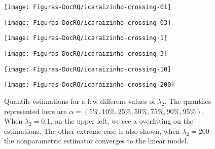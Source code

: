 	
\begin{figure*}[htp]
  \centering
  \begin{minipage}[t]{0.4\linewidth}
    \centering
    \begin{minipage}[t]{\linewidth}
      \centering     \texttt{[image: Figuras-DocRQ/icaraizinho-crossing-01]}
    \end{minipage}
    \begin{minipage}[b]{\linewidth}
      \centering     \texttt{[image: Figuras-DocRQ/icaraizinho-crossing-03]}
    \end{minipage}
     \begin{minipage}[b]{\linewidth}
      \centering     \texttt{[image: Figuras-DocRQ/icaraizinho-crossing-1]}
     \end{minipage}
  \end{minipage}
  \begin{minipage}[t]{0.4\linewidth}
    \centering
    \begin{minipage}[t]{\linewidth}
      \centering     \texttt{[image: Figuras-DocRQ/icaraizinho-crossing-3]}
    \end{minipage}
    \begin{minipage}[b]{\linewidth}
      \centering     \texttt{[image: Figuras-DocRQ/icaraizinho-crossing-10]}
    \end{minipage}
     \begin{minipage}[b]{\linewidth}
      \centering     \texttt{[image: Figuras-DocRQ/icaraizinho-crossing-200]}
      \label{fig:npqar-cross}
     \end{minipage}
  \end{minipage}
  \caption{Quantile estimations for a few different values of $\lambda_2$. The quantiles represented here are $\alpha = (5\%, 10\%, 25\%, 50\%, 75\%, 90\%, 95\%)$. When $\lambda_2 = 0.1$, on the upper left, we see a overfitting on the estimations. The other extreme case is also shown, when $\lambda_2=200$ the nonparametric estimator converges to the linear model.}
  \label{fig:npqar-results}
\end{figure*}

